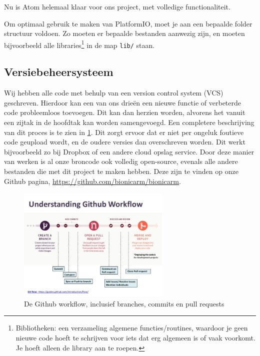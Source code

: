 Nu is Atom helemaal klaar voor ons project, met volledige
functionaliteit.

Om optimaal gebruik te maken van PlatformIO, moet je aan een bepaalde
folder structuur voldoen. Zo moeten er bepaalde bestanden aanwezig zijn,
en moeten bijvoorbeeld alle libraries\footnote{Bibliotheken: een
  verzameling algemene functies/routines, waardoor je geen nieuwe code
  hoeft te schrijven voor iets dat erg algemeen is of vaak voorkomt. Je
  hoeft alleen de library aan te roepen.} in de map \texttt{lib/} staan.

\hypertarget{versiebeheersysteem}{%
\subsection{Versiebeheersysteem}\label{versiebeheersysteem}}

Wij hebben alle code met behulp van een version control system (VCS)
geschreven. Hierdoor kan een van ons drieën een nieuwe functie of
verbeterde code probleemloos toevoegen. Dit kan dan herzien worden,
alvorens het vanuit een zijtak in de hoofdtak kan worden samengevoegd.
Een completere beschrijving van dit proces is te zien in
\cref{fig:github}. Dit zorgt ervoor dat er niet per
ongeluk foutieve code geupload wordt, en de oudere versies dan
overschreven worden. Dit werkt bijvoorbeeld zo bij Dropbox of een andere
cloud opslag service. Door deze manier van werken is al onze broncode
ook volledig open-source, evenals alle andere bestanden die met dit
project te maken hebben. Deze zijn te vinden op onze Github pagina,
\url{https://github.com/bionicarm/bionicarm}.

\begin{figure}
\centering
\includegraphics[width=0.65\textwidth,height=\textheight]{img/image_26.jpg}
\caption{De Github workflow, inclusief branches, commits en pull
requests\label{fig:github}}
\end{figure}

